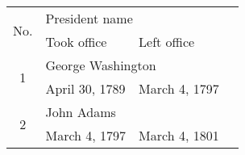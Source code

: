 \usepackage{multirow}

\begin{tabular}{c|lll}
	\multirow{2}{*}{No.} & \multicolumn{2}{l}{President name}\\
	    & Took office & Left office\\
	\hline
	\hline
	\multirow{2}{*}{1} & \multicolumn{2}{l}{George Washington}\\
	\cline{2-3}
	  & April 30, 1789 & March 4, 1797\\
	\hline
	\multirow{2}{*}{2} & \multicolumn{2}{l}{John Adams}\\
	\cline{2-3}
	  & March 4, 1797 & March 4, 1801\\
\end{tabular}

